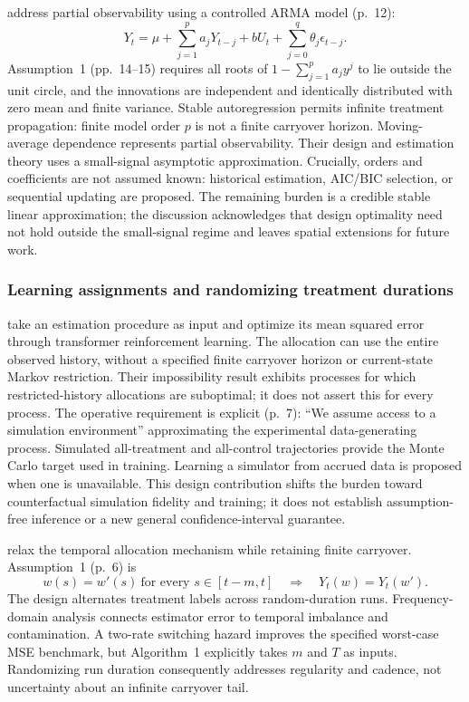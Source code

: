 \citet{sun2024} address partial observability using a controlled ARMA model (p.~12):
\begin{equation}
 Y_t=\mu+\sum_{j=1}^{p}a_jY_{t-j}+bU_t
       +\sum_{j=0}^{q}\theta_j\epsilon_{t-j}.
\end{equation}
Assumption~1 (pp.~14--15) requires all roots of $1-\sum_{j=1}^{p}a_j y^j$ to lie outside the unit circle, and the innovations are independent and identically distributed with zero mean and finite variance. Stable autoregression permits infinite treatment propagation: finite model order $p$ is not a finite carryover horizon. Moving-average dependence represents partial observability. Their design and estimation theory uses a small-signal asymptotic approximation. Crucially, orders and coefficients are not assumed known: historical estimation, AIC/BIC selection, or sequential updating are proposed. The remaining burden is a credible stable linear approximation; the discussion acknowledges that design optimality need not hold outside the small-signal regime and leaves spatial extensions for future work.

\subsubsection{Learning assignments and randomizing treatment durations}

\citet{wu2026} take an estimation procedure as input and optimize its mean squared error through transformer reinforcement learning. The allocation can use the entire observed history, without a specified finite carryover horizon or current-state Markov restriction. Their impossibility result exhibits processes for which restricted-history allocations are suboptimal; it does not assert this for every process. The operative requirement is explicit (p.~7): ``We assume access to a simulation environment'' approximating the experimental data-generating process. Simulated all-treatment and all-control trajectories provide the Monte Carlo target used in training. Learning a simulator from accrued data is proposed when one is unavailable. This design contribution shifts the burden toward counterfactual simulation fidelity and training; it does not establish assumption-free inference or a new general confidence-interval guarantee.

\citet{hu2026} relax the temporal allocation mechanism while retaining finite carryover. Assumption~1 (p.~6) is
\begin{equation}
 w(s)=w'(s)\ \text{for every }s\in[t-m,t]
 \quad\Longrightarrow\quad Y_t(w)=Y_t(w').
\end{equation}
The design alternates treatment labels across random-duration runs. Frequency-domain analysis connects estimator error to temporal imbalance and contamination. A two-rate switching hazard improves the specified worst-case MSE benchmark, but Algorithm~1 explicitly takes $m$ and $T$ as inputs. Randomizing run duration consequently addresses regularity and cadence, not uncertainty about an infinite carryover tail.

